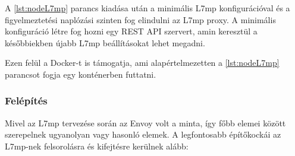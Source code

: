 A \ref{lst:nodeL7mp} parancs kiadása után a minimális L7mp konfigurációval és a 
figyelmeztetési naplózási szinten fog elindulni az L7mp proxy. A minimális konfiguráció 
létre fog hozni egy REST API szervert, amin keresztül a későbbiekben újabb L7mp 
beállításokat lehet megadni.

Ezen felül a Docker-t is támogatja, ami alapértelmezetten a \ref{lst:nodeL7mp} parancsot 
fogja egy konténerben futtatni.

\subsubsection{Felépítés}

Mivel az L7mp tervezése során az Envoy volt a minta, így főbb elemei között szerepelnek
ugyanolyan vagy hasonló elemek. A legfontosabb építőkockái az L7mp-nek felsorolásra és 
kifejtésre kerülnek alább: 

